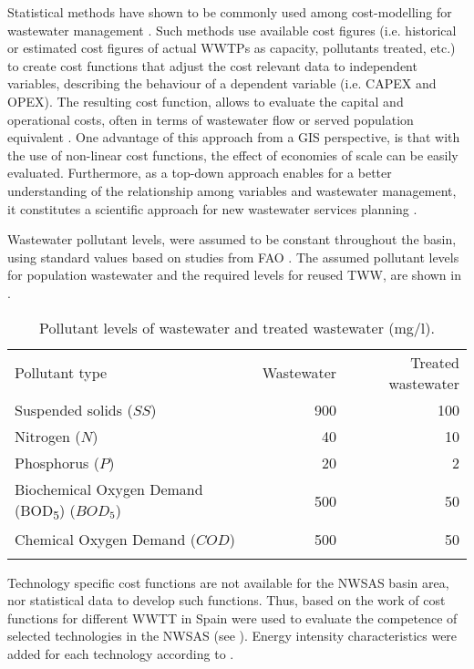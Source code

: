 Statistical methods have shown to be commonly used among cost-modelling for wastewater management \cite{Costmodellingwastewater2011,Assessmentwastewatertreatment2012,Economicfeasibility2012}. Such methods use available cost figures (i.e. historical or estimated cost figures of actual WWTPs as capacity, pollutants treated, etc.) to create cost functions that adjust the cost relevant data to independent variables, describing the behaviour of a dependent variable (i.e. CAPEX and OPEX). The resulting cost function, allows to evaluate the capital and operational costs, often in terms of wastewater flow or served population equivalent \cite{Economicvaluationwastewater2015}. One advantage of this approach from a GIS perspective, is that with the use of non-linear cost functions, the effect of economies of scale can be easily evaluated. Furthermore, as a top-down approach enables for a better understanding of the relationship among variables and wastewater management, it constitutes a scientific approach for new wastewater services planning \cite{Costmodellingwastewater2011}. 

Wastewater pollutant levels, were assumed to be constant throughout the basin, using standard values based on studies from FAO \cite{fao1985water}. The assumed pollutant levels for population wastewater and the required levels for reused TWW, are shown in .

\begin{table}[!ht]
	\caption{\label{tbl:pollutans}Pollutant levels of wastewater and treated wastewater (mg/l).}
	\begin{indented}
	\item[]\begin{tabular}{@{}l r r}
		\br
		Pollutant type & Wastewater & Treated wastewater\\
		\mr
		Suspended solids ($SS$) & 900 & 100\\
		Nitrogen ($N$) & 40 & 10\\
		Phosphorus ($P$) & 20 & 2\\
		Biochemical Oxygen Demand (BOD\textsubscript{5}) ($BOD_5$) & 500 & 50\\
		Chemical Oxygen Demand ($COD$)& 500 & 50\\
		\br
	\end{tabular}
	\end{indented}
\end{table}

Technology specific cost functions are not available for the NWSAS basin area, nor statistical data to develop such functions. Thus, based on the work of \citet{Assessmentwastewatertreatment2012} cost functions for different WWTT in Spain were used to evaluate the competence of selected technologies in the NWSAS (see ). Energy intensity characteristics were added for each technology according to \cite{Energypatternanalysis2012,ComparativeAnalysisEnergy2017}.

